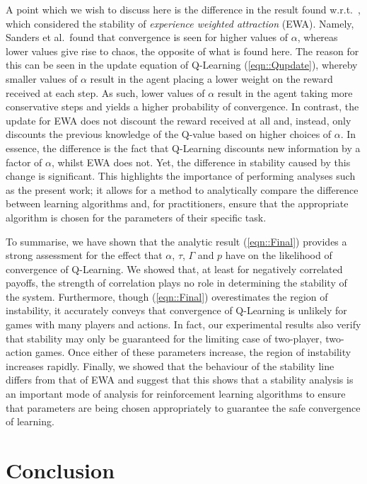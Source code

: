 \documentclass[sigconf,anonymous]{aamas}
\begin{document}
A point which we wish to discuss here is the difference in the result
found w.r.t.~\cite{Sanders2018}, which considered the stability of
\textit{experience weighted attraction} (EWA). Namely, Sanders et
al.~found that convergence is seen for higher values of $\alpha$,
whereas lower values give rise to chaos, the opposite of what is found
here. The reason for this can be seen in the update equation of
Q-Learning (\ref{eqn::Qupdate}), whereby smaller values of $\alpha$
result in the agent placing a lower weight on the reward received at
each step. As such, lower values of $\alpha$ result in the agent
taking more conservative steps and yields a higher probability of
convergence. In contrast, the update for EWA does not discount the
reward received at all and, instead, only discounts the previous
knowledge of the Q-value based on higher choices of $\alpha$. In
essence, the difference is the fact that Q-Learning discounts new
information by a factor of $\alpha$, whilst EWA does not. Yet, the
difference in stability caused by this change is significant. This
highlights the importance of performing analyses such as the present
work; it allows for a method to analytically compare the difference
between learning algorithms and, for practitioners, ensure that the
appropriate algorithm is chosen for the parameters of their specific
task.


To summarise, we have shown that the analytic result
(\ref{eqn::Final}) provides a strong assessment for the effect that
$\alpha$, $\tau$, $\Gamma$ and $p$ have on the likelihood of
convergence of Q-Learning. We showed that, at least for negatively
correlated payoffs, the strength of correlation plays no role in
determining the stability of the system. Furthermore, though
(\ref{eqn::Final}) overestimates the region of instability, it
accurately conveys that convergence of Q-Learning is unlikely for
games with many players and actions. In fact, our experimental results
also verify that stability may only be guaranteed for the limiting
case of two-player, two-action games. Once either of these parameters increase, the region of instability increases rapidly.
%
Finally, we showed that the behaviour of the stability line differs
from that of EWA and suggest that this shows that a stability analysis
is an important mode of analysis for reinforcement learning algorithms
to ensure that parameters are being chosen appropriately to guarantee
the safe convergence of learning.

\section{Conclusion}
\end{document}

